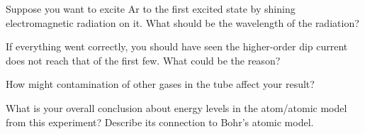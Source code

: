 \documentclass[addpoints]{physlabs} %
\begin{document}
\begin{postlab}
\begin{solution}[5cm]
    \end{solution}

    \filbreak
    \question[2] Suppose you want to excite Ar to the first excited state by shining electromagnetic radiation on it. What should be the wavelength of the radiation?
    \begin{solution}[3cm]
        
    \end{solution}

    \filbreak
    \question[1] If everything went correctly, you should have seen the higher-order dip current does not reach that of the first few. What could be the reason?
    \begin{solution}[3cm]
        
    \end{solution}

    \filbreak
    \question[1] How might contamination of other gases in the tube affect your result?
    \begin{solution}[3cm]
        
    \end{solution}

    \filbreak
    \question[3] What is your overall conclusion about energy levels in the atom/atomic model from this experiment? Describe its connection to Bohr’s atomic model.
    \begin{solution}[5cm]
        
    \end{solution}

    
\end{postlab}
\end{document}
